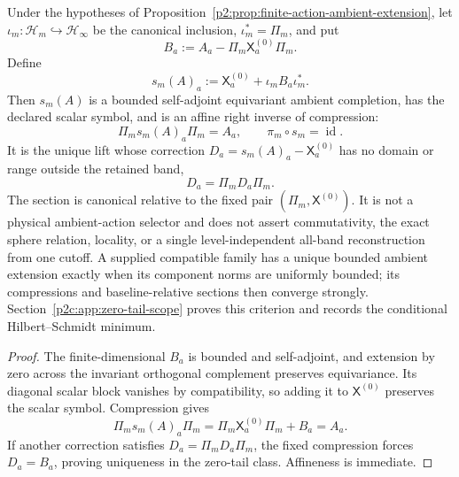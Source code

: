 \documentclass[12pt,a4paper]{article}
\begin{document}
\begin{theorem}
\label{p2c:thm:canonical-zero-tail-ambient-section}
Under the hypotheses of
Proposition~\ref{p2:prop:finite-action-ambient-extension}, let
\(\iota_m:\mathcal H_m\hookrightarrow\mathcal H_\infty\) be the canonical
inclusion, \(\iota_m^*=\Pi_m\), and put
\[
 B_a:=A_a-\Pi_m\mathsf X_a^{(0)}\Pi_m.
\]
Define
\[
 \boxed{
 s_m(A)_a:=\mathsf X_a^{(0)}
 +\iota_mB_a\iota_m^*.}
\]
Then \(s_m(A)\) is a bounded self-adjoint equivariant ambient completion,
has the declared scalar symbol, and is an affine right inverse of compression:
\[
 \boxed{\Pi_ms_m(A)_a\Pi_m=A_a,\qquad
 \pi_m\circ s_m=\operatorname{id}.}
\]
It is the unique lift whose correction
\(D_a=s_m(A)_a-\mathsf X_a^{(0)}\) has no domain or range outside the retained
band,
\[
 D_a=\Pi_mD_a\Pi_m.
\]
The section is canonical relative to the fixed pair
\((\Pi_m,\mathsf X^{(0)})\).  It is not a physical ambient-action selector
and does not assert commutativity, the exact sphere relation, locality, or a
single level-independent all-band reconstruction from one cutoff. A supplied
compatible family has a unique bounded ambient extension exactly when its
component norms are uniformly bounded; its compressions and baseline-relative
sections then converge strongly. Section~\ref{p2c:app:zero-tail-scope}
proves this criterion and records the conditional Hilbert--Schmidt minimum.
\end{theorem}

\begin{proof}
The finite-dimensional \(B_a\) is bounded and self-adjoint, and extension by
zero across the invariant orthogonal complement preserves equivariance.  Its
diagonal scalar block vanishes by compatibility, so adding it to
\(\mathsf X^{(0)}\) preserves the scalar symbol.  Compression gives
\[
 \Pi_ms_m(A)_a\Pi_m
 =\Pi_m\mathsf X_a^{(0)}\Pi_m+B_a=A_a.
\]
If another correction satisfies \(D_a=\Pi_mD_a\Pi_m\), the fixed compression
forces \(D_a=B_a\), proving uniqueness in the zero-tail class.  Affineness is
immediate.
\end{proof}
\end{document}
